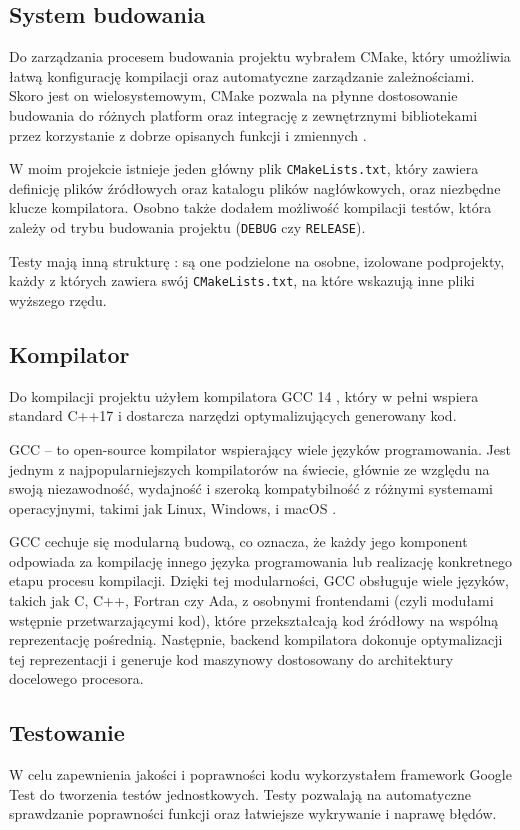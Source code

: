 \subsection{System budowania}
Do zarządzania procesem budowania projektu wybrałem CMake, który umożliwia łatwą konfigurację kompilacji oraz automatyczne zarządzanie zależnościami. Skoro jest on wielosystemowym, CMake pozwala na płynne dostosowanie budowania do różnych platform oraz integrację z zewnętrznymi bibliotekami przez korzystanie z dobrze opisanych funkcji i zmiennych \cite{cmake}.

W moim projekcie istnieje jeden główny plik \texttt{CMakeLists.txt}, który zawiera definicję plików źródłowych oraz katalogu plików nagłówkowych, oraz niezbędne klucze kompilatora. Osobno także dodałem możliwość kompilacji testów, która zależy od trybu budowania projektu (\texttt{DEBUG} czy \texttt{RELEASE}).

Testy mają inną strukturę : są one podzielone na osobne, izolowane podprojekty, każdy z których zawiera swój \texttt{CMakeLists.txt}, na które wskazują inne pliki wyższego rzędu.

\subsection{Kompilator}
Do kompilacji projektu użyłem kompilatora GCC 14 \cite{gcc_14}, który w pełni wspiera standard C++17 i dostarcza narzędzi optymalizujących generowany kod.

GCC  -- to open-source kompilator wspierający wiele języków programowania. Jest jednym z najpopularniejszych kompilatorów na świecie, głównie ze względu na swoją niezawodność, wydajność i szeroką kompatybilność z różnymi systemami operacyjnymi, takimi jak Linux, Windows, i macOS \cite{gcc}. 

GCC cechuje się modularną budową, co oznacza, że każdy jego komponent odpowiada za kompilację innego języka programowania lub realizację konkretnego etapu procesu kompilacji. Dzięki tej modularności, GCC obsługuje wiele języków, takich jak C, C++, Fortran czy Ada, z osobnymi frontendami (czyli modułami wstępnie przetwarzającymi kod), które przekształcają kod źródłowy na wspólną reprezentację pośrednią. Następnie, backend kompilatora dokonuje optymalizacji tej reprezentacji i generuje kod maszynowy dostosowany do architektury docelowego procesora.

\subsection{Testowanie}
W celu zapewnienia jakości i poprawności kodu wykorzystałem framework Google Test do tworzenia testów jednostkowych. Testy pozwalają na automatyczne sprawdzanie poprawności funkcji oraz łatwiejsze wykrywanie i naprawę błędów.


